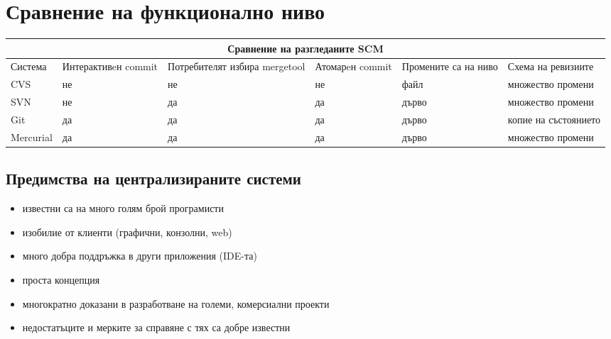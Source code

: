 \documentclass[a4paper]{article}
\begin{document}
\section{Сравнение на функционално ниво}
  \begin{tabular} { | l | p{22 mm} | p{21 mm} | p{14 mm} | p{17 mm} | p{34 mm} |}
  \multicolumn{6}{c}{Сравнение на разгледаните SCM} \\
  \hline
  Система     & Интерактивeн commit & Потребителят избира mergetool & Атомарeн commit & Промените са на ниво & Схема на ревизиите \\
  \hline
  CVS         & не                  & не                            & не              & файл                 & множество промени \\
  SVN         & не                  & да                            & да              & дърво                & множество промени \\
  Git         & да                  & да                            & да              & дърво                & копие на състоянието \\
  Mercurial   & да                  & да                            & да              & дърво                & множество промени\\
  \hline
  \end{tabular}

  \vspace{10 pt}

  \subsection{Предимства на централизираните системи}
    \begin{itemize}
      \item известни са на много голям брой програмисти
      \item изобилие от клиенти (графични, конзолни, web)
      \item много добра поддръжка в други приложения (IDE-та)
      \item проста концепция
      \item многократно доказани в разработване на големи, комерсиални проекти
      \item недостатъците и мерките за справяне с тях са добре известни
    \end{itemize}
\end{document}
